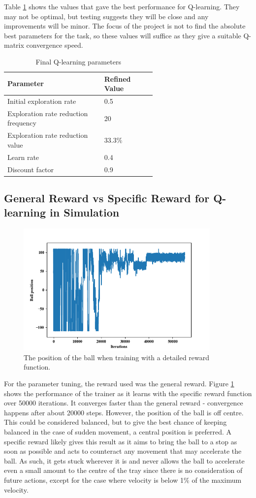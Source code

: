 \documentclass[12pt,a4paper]{article}
\begin{document}
Table \ref{q_params_final} shows the values that gave the best performance for Q-learning. They may not be optimal, but testing suggests they will be close and any improvements will be minor. The focus of the project is not to find the absolute best parameters for the task, so these values will suffice as they give a suitable Q-matrix convergence speed.
\begin{table}[htb]
\centering
\caption{Final Q-learning parameters}

\label{q_params_final}
\begin{tabular}{>{\raggedright}p{0.4\linewidth}p{0.2\linewidth}}\hline
Parameter & Refined Value\\ \hline\hline
Initial exploration rate & 0.5\\ \hline
Exploration rate reduction frequency & 20\\ \hline
Exploration rate reduction value & 33.3\% \\\hline
Learn rate & 0.4 \\\hline
Discount factor & 0.9 \\\hline
\end{tabular}
\end{table}


\subsection{General Reward vs Specific Reward for Q-learning in Simulation}
\begin{figure}[H]
	\centering
	\includegraphics[width=10cm]{157}
	\caption{The position of the ball when training with a detailed reward function.}
	\label{f5}
\end{figure}
For the parameter tuning, the reward used was the general reward. Figure \ref{f5} shows the performance of the trainer as it learns with the specific reward function over 50000 iterations. It converges faster than the general reward - convergence happens after about 20000 steps. However, the position of the ball is off centre. This could be considered balanced, but to give the best chance of keeping balanced in the case of sudden movement, a central position is preferred. A specific reward likely gives this result as it aims to bring the ball to a stop as soon as possible and acts to counteract any movement that may accelerate the ball. As such, it gets stuck wherever it is and never allows the ball to accelerate even a small amount to the centre of the tray since there is no consideration of future actions, except for the case where velocity is below 1\% of the maximum velocity.
\end{document}
